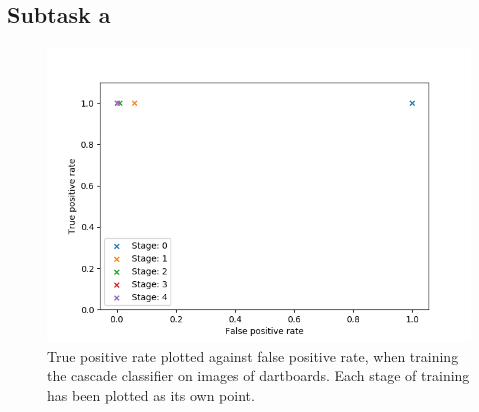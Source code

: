 \documentclass[conference]{IEEEtran}
\begin{document}
\subsection{Subtask a}
\begin{figure}[htbp]
\begin{center}
\includegraphics[width=\linewidth]{images/TPRvsFPR}
\caption{True positive rate plotted against false positive rate, when training the cascade classifier on images of dartboards. Each stage of training has been plotted as its own point.}
\label{default}
\end{center}
\end{figure}
\end{document}
